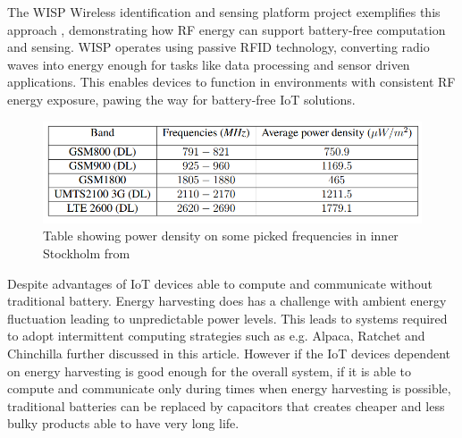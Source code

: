 \documentclass[article,a4paper]{IEEEtran}
\begin{document}
\newline\newline
The WISP Wireless identification and sensing platform project exemplifies this approach \cite{WISPproject}, demonstrating how RF energy can support battery-free computation and sensing. WISP operates using passive RFID technology, converting radio waves into energy enough for tasks like data processing and sensor driven applications. This enables devices to function in environments with consistent RF energy exposure, pawing the way for battery-free IoT solutions.
\begin{figure}
    \includegraphics[width=\columnwidth]{Ambientradiofrequency.png}
    \caption{ Table showing power density on some picked frequencies in inner Stockholm from \cite{RF_radiation_sthlm} }
    \label{fig1_energy_sthlm}
\end{figure}
\newline\newline
Despite advantages of IoT devices able to compute and communicate without traditional battery. Energy harvesting does has a challenge with ambient energy fluctuation leading to unpredictable power levels. This leads to systems required to adopt intermittent computing strategies such as e.g. Alpaca, Ratchet and Chinchilla further discussed in this article. However if the IoT devices dependent on energy harvesting is good enough for the overall system, if it is able to compute and communicate only during times when energy harvesting is possible, traditional batteries can be replaced by capacitors that creates cheaper and less bulky products able to have very long life.  
\end{document}
